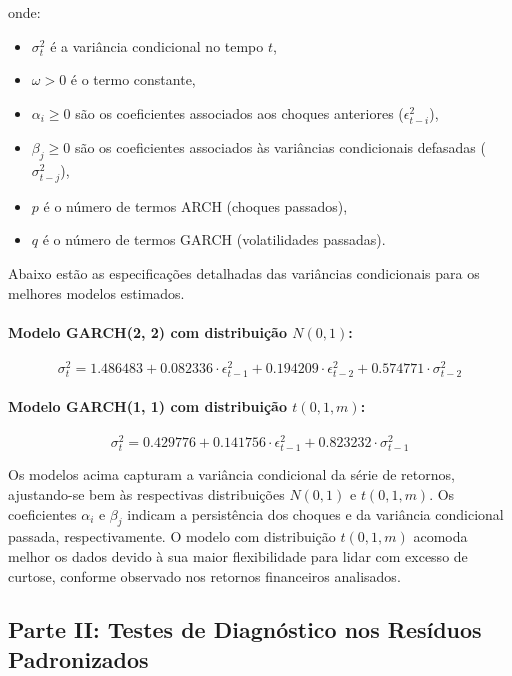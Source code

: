 \documentclass[a4paper, 12pt]{article}
\begin{document}
onde:
\begin{itemize}
    \item \(\sigma_t^2\) é a variância condicional no tempo \(t\),
    \item \(\omega > 0\) é o termo constante,
    \item \(\alpha_i \geq 0\) são os coeficientes associados aos choques anteriores (\(\epsilon_{t-i}^2\)),
    \item \(\beta_j \geq 0\) são os coeficientes associados às variâncias condicionais defasadas (\(\sigma_{t-j}^2\)),
    \item \(p\) é o número de termos ARCH (choques passados),
    \item \(q\) é o número de termos GARCH (volatilidades passadas).
\end{itemize}

Abaixo estão as especificações detalhadas das variâncias condicionais para os melhores modelos estimados.

\paragraph{Modelo GARCH(2, 2) com distribuição \( N(0,1) \):}
\begin{equation}
    \sigma_t^2 = 1.486483 + 0.082336 \cdot \epsilon_{t-1}^2 + 0.194209 \cdot \epsilon_{t-2}^2 + 0.574771 \cdot \sigma_{t-2}^2
    \label{eq:garch_normal}
\end{equation}

\paragraph{Modelo GARCH(1, 1) com distribuição \( t(0,1,m) \):}
\begin{equation}
    \sigma_t^2 = 0.429776 + 0.141756 \cdot \epsilon_{t-1}^2 + 0.823232 \cdot \sigma_{t-1}^2
    \label{eq:garch_student}
\end{equation}


Os modelos acima capturam a variância condicional da série de retornos, ajustando-se bem às respectivas distribuições \( N(0,1) \) e \( t(0,1,m) \). 
Os coeficientes \(\alpha_i\) e \(\beta_j\) indicam a persistência dos choques e da variância condicional passada, respectivamente. O modelo com distribuição \(t(0,1,m)\) acomoda melhor os dados devido à sua maior flexibilidade para lidar com excesso de curtose, conforme observado nos retornos financeiros analisados.



\subsection{Parte II: Testes de Diagnóstico nos Resíduos Padronizados}\label{subsec:tarefa2_pt2}
\end{document}
